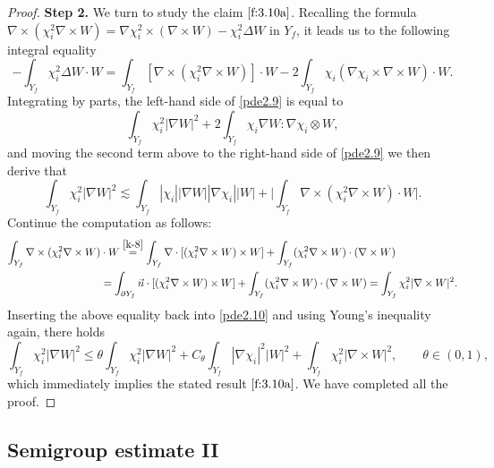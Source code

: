 \documentclass[13pt,CJK]{article}
\theoremstyle{plain}                       %
\theoremstyle{remark}
\numberwithin{equation}{section}
\begin{document}
\begin{proof}
\textbf{Step 2.} We turn to study the claim $\eqref{f:3.10a}$.
Recalling the formula $\nabla\times(\chi_i^2\nabla\times W)=\nabla\chi^2_i\times(\nabla\times W)-\chi_i^2\Delta W$ in $Y_f$, it leads us to the following integral equality
\begin{equation}\label{pde2.9}
-\int_{Y_f}\chi_i^2\Delta W\cdot W =\int_{Y_f}[\nabla\times(\chi_i^2\nabla\times W)]\cdot W -2\int_{Y_f}\chi_i(\nabla\chi_i\times\nabla\times W)\cdot W.
\end{equation}
Integrating by parts, the left-hand side of \eqref{pde2.9} is equal to
\begin{equation*}
\int_{Y_f}\chi_i^2|\nabla W|^2+2\int_{Y_f}\chi_i\nabla W:\nabla\chi_i\otimes W,
\end{equation*}
and moving the second term above to the right-hand side of \eqref{pde2.9}
we then derive that
\begin{equation}\label{pde2.10}
\int_{Y_f}\chi_i^2|\nabla W|^2 \lesssim
\int_{Y_f}|\chi_i||\nabla W||\nabla\chi_i||W|+
\Big|\int_{Y_f}\nabla\times(\chi_i^2\nabla\times W)\cdot W\Big|.
\end{equation}
Continue the computation as follows:
\begin{equation*}%
\begin{aligned}
\int_{Y_f} \nabla\times(\chi_i^2\nabla\times W)
&\cdot W
\overset{\eqref{k-8}}{=}\int_{Y_f}\nabla\cdot[(\chi_i^2\nabla\times W)\times W]
+\int_{Y_f}
(\chi_i^2\nabla\times W)\cdot (\nabla\times W)\\
&=\int_{\partial Y_f}\vec{n}\cdot[(\chi_i^2\nabla\times W)\times W]
+\int_{Y_f}
(\chi_i^2\nabla\times W)\cdot (\nabla\times W)
=\int_{Y_f}
\chi_i^2|\nabla\times W|^2.
\end{aligned}
\end{equation*}
Inserting the above equality back into \eqref{pde2.10} and using
Young's inequality again, there holds
\begin{equation*}
\int_{Y_f}\chi_i^2|\nabla W|^2\leq
\theta\int_{Y_f}\chi_i^2|\nabla W|^2 +C_{\theta}\int_{Y_f}|\nabla\chi_i|^2|W|^2
+\int_{Y_f}\chi_i^2|\nabla\times W|^2,
\qquad \theta\in(0,1),
\end{equation*}
which immediately implies the stated result $\eqref{f:3.10a}$.
We have completed all the proof.
\end{proof}



\subsection{\centering Semigroup estimate II}\label{subsec:3.2}
\end{document}
